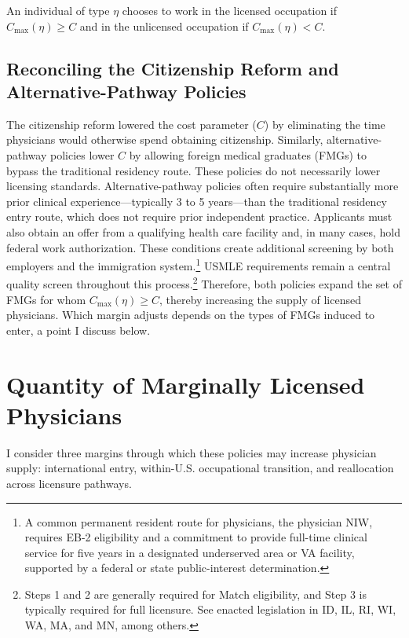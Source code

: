 \documentclass[12pt]{article}
\begin{document}
An individual of type $\eta$ chooses to work in the licensed occupation if $C_{\max}(\eta) \geq C$ and in the unlicensed occupation if $C_{\max}(\eta) < C$.

\subsection{Reconciling the Citizenship Reform and Alternative-Pathway Policies}

The citizenship reform lowered the cost parameter ($C$) by eliminating the time physicians would otherwise spend obtaining citizenship. Similarly, alternative-pathway policies lower $C$ by allowing foreign medical graduates (FMGs) to bypass the traditional residency route. These policies do not necessarily lower licensing standards. Alternative-pathway policies often require substantially more prior clinical experience—typically 3 to 5 years—than the traditional residency entry route, which does not require prior independent practice. Applicants must also obtain an offer from a qualifying health care facility and, in many cases, hold federal work authorization. These conditions create additional screening by both employers and the immigration system.\footnote{A common permanent resident route for physicians, the physician NIW, requires EB-2 eligibility and a commitment to provide full-time clinical service for five years in a designated underserved area or VA facility, supported by a federal or state public-interest determination.} USMLE requirements remain a central quality screen throughout this process.\footnote{Steps 1 and 2 are generally required for Match eligibility, and Step 3 is typically required for full licensure. See enacted legislation in ID, IL, RI, WI, WA, MA, and MN, among others.} Therefore, both policies expand the set of FMGs for whom $C_{\max}(\eta) \geq C$, thereby increasing the supply of licensed physicians. Which margin adjusts depends on the types of FMGs induced to enter, a point I discuss below.


\section{Quantity of Marginally Licensed Physicians}

I consider three margins through which these policies may increase physician supply: international entry, within-U.S. occupational transition, and reallocation across licensure pathways.
\end{document}

